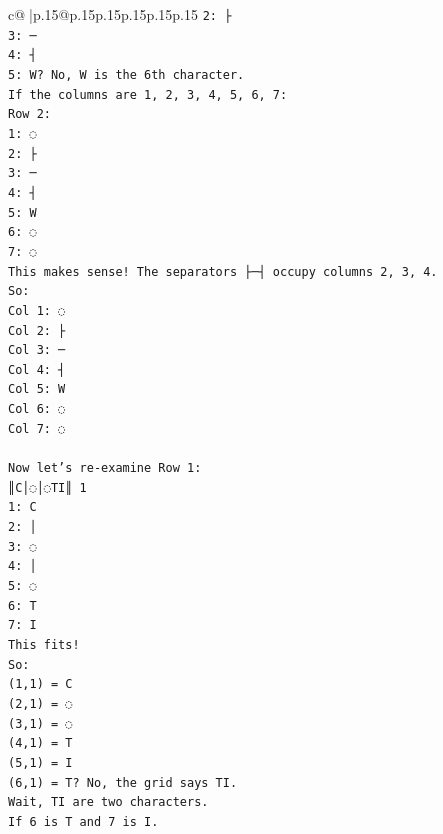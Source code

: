 \documentclass{article}
\begin{document}
{\begin{supertabular}{c@{$\;$}|p{.15\linewidth}@{}p{.15\linewidth}p{.15\linewidth}p{.15\linewidth}p{.15\linewidth}p{.15\linewidth}}
{{{\texttt{2: ├} \\
\texttt{3: ─} \\
\texttt{4: ┤} \\
\texttt{5: W? No, W is the 6th character.} \\
\texttt{If the columns are 1, 2, 3, 4, 5, 6, 7:} \\
\texttt{Row 2:} \\
\texttt{1: ◌} \\
\texttt{2: ├} \\
\texttt{3: ─} \\
\texttt{4: ┤} \\
\texttt{5: W} \\
\texttt{6: ◌} \\
\texttt{7: ◌} \\
\texttt{This makes sense! The separators ├─┤ occupy columns 2, 3, 4.} \\
\texttt{So:} \\
\texttt{Col 1: ◌} \\
\texttt{Col 2: ├} \\
\texttt{Col 3: ─} \\
\texttt{Col 4: ┤} \\
\texttt{Col 5: W} \\
\texttt{Col 6: ◌} \\
\texttt{Col 7: ◌} \\
\\ 
\texttt{Now let's re{-}examine Row 1:} \\
\texttt{║C│◌│◌TI║ 1} \\
\texttt{1: C} \\
\texttt{2: │} \\
\texttt{3: ◌} \\
\texttt{4: │} \\
\texttt{5: ◌} \\
\texttt{6: T} \\
\texttt{7: I} \\
\texttt{This fits!} \\
\texttt{So:} \\
\texttt{(1,1) = C} \\
\texttt{(2,1) = ◌} \\
\texttt{(3,1) = ◌} \\
\texttt{(4,1) = T} \\
\texttt{(5,1) = I} \\
\texttt{(6,1) = T? No, the grid says TI.} \\
\texttt{Wait, TI are two characters.} \\
\texttt{If 6 is T and 7 is I.} \\
}}}
\end{supertabular}}
\end{document}
